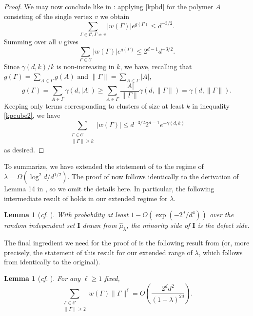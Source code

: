\documentclass[a4paper]{amsart}
\newtheorem{lem}[thm]{Lemma}
\theoremstyle{definition}
\newcommand{\cC}{\mathcal{C} }
\newcommand{\beq}[1]{\begin{equation}\label{#1}}
\newcommand{\enq}[0]{\end{equation}}
\newcommand{\0}[0]{\emptyset}
\newcommand{\lam}{\lambda}
\begin{document}
\begin{proof}
    We may now conclude like in \cite{hypercube}: applying \eqref{kpbd} for the polymer $A$ consisting of the single vertex $v$ we obtain
    \[ \sum_{\Gamma\in\cC , \Gamma\not\sim v} |w(\Gamma)|e^{g(\Gamma)} \leq d^{-3/2}.\]
    Summing over all $v$ gives
    \beq{kpcube2} \sum_{\Gamma\in\cC} |w(\Gamma)|e^{g(\Gamma)} \leq 2^{d-1}d^{-3/2}. \enq
    Since $\gamma(d, k)/k$ is non-increasing in $k$, we have, recalling that $g(\Gamma)=\sum_{A\in\Gamma} g(A)$ and $\|\Gamma\|=\sum_{A\in\Gamma} |A|$,
    \[ g(\Gamma)=\sum_{A\in\Gamma} \gamma(d, |A|)\geq \sum_{A\in\Gamma} \frac{|A|}{\|\Gamma\|} \gamma(d, \|\Gamma\|) = \gamma(d, \|\Gamma\|). \]
    Keeping only terms corresponding to clusters of size at least $k$ in inequality \eqref{kpcube2}, we have
    \[ \sum_{\substack{\Gamma\in\cC \\ \|\Gamma\| \geq k}} |w(\Gamma)| \leq d^{-3/2}2^{d-1}e^{-\gamma(d, k)}\]
    as desired.
\end{proof}

To summarize, we have extended the statement of \cite[Lemma 15]{hypercube} to the regime of $\lam=\Omega(\log^2 d/d^{1/2})$. The proof of  now follows identically to the derivation of Lemma 14 in \cite{hypercube}, so we omit the details here. In particular, the following intermediate result of \cite{hypercube} holds in our extended regime for $\lam$.

\begin{lem}[\textit{cf.} {\cite[Lemma 17]{hypercube}}] \label{lem17}
    With probability at least $1-O(\exp(-2^d/d^4))$ over the random independent set $\mathbf{I}$ drawn from $\hat{\mu}_\lam$, the minority side of $\mathbf{I}$ is the defect side.
\end{lem}

The final ingredient we need for the proof of  is the following result from \cite{struct} (or, more precisely, the statement of this result for our extended range of $\lam$, which follows from  identically to the original).
\begin{lem}[\textit{cf.} {\cite[Lemma 11]{struct}}] \label{lem11}
    For any $\ell\geq 1$ fixed,
    \[ \sum_{\substack{\Gamma\in\cC \\ \|\Gamma\|\geq 2}} w(\Gamma)\|\Gamma\|^{\ell} =O\left(\frac{2^d d^2}{(1+\lam)^{2d}} \right).\]
\end{lem}
\end{document}
